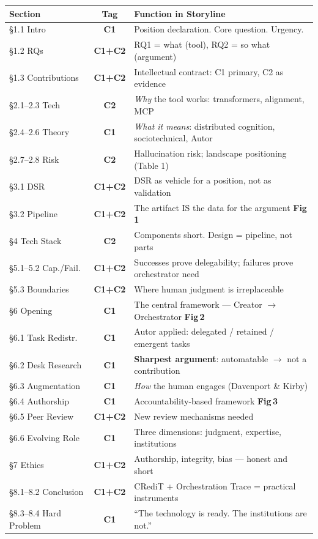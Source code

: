 \documentclass[11pt,a4paper]{article}
\newcommand{\ctag}[2]{\colorbox{#1}{\small\color{white}\textbf{#2}}}
\newcommand{\Cone}{\ctag{c1color}{C1}}
\newcommand{\Ctwo}{\ctag{c2color}{C2}}
\newcommand{\Cboth}{\ctag{bothcolor}{C1+C2}}
\newcommand{\figref}[1]{{\scriptsize\color{figcolor}\textbf{Fig\,#1}}}
\begin{document}
\renewcommand{\arraystretch}{1.12}
{\small
\begin{tabularx}{\textwidth}{@{} l c X @{}}
\toprule
\textbf{Section} & \textbf{Tag} & \textbf{Function in Storyline} \\
\midrule
\S1.1 Intro & \Cone & Position declaration. Core question. Urgency. \\
\S1.2 RQs & \Cboth & RQ1 = what (tool), RQ2 = so what (argument) \\
\S1.3 Contributions & \Cboth & Intellectual contract: C1 primary, C2 as evidence \\
\midrule
\S2.1--2.3 Tech & \Ctwo & \textit{Why} the tool works: transformers, alignment, MCP \\
\S2.4--2.6 Theory & \Cone & \textit{What it means}: distributed cognition, sociotechnical, Autor \\
\S2.7--2.8 Risk & \Ctwo & Hallucination risk; landscape positioning (Table 1) \\
\midrule
\S3.1 DSR & \Cboth & DSR as vehicle for a position, not as validation \\
\S3.2 Pipeline & \Cboth & The artifact IS the data for the argument \hfill \figref{1} \\
\midrule
\S4 Tech Stack & \Ctwo & Components short. Design = pipeline, not parts \\
\S5.1--5.2 Cap./Fail. & \Cboth & Successes prove delegability; failures prove orchestrator need \\
\S5.3 Boundaries & \Cboth & Where human judgment is irreplaceable \\
\midrule
\S6 Opening & \Cone & The central framework --- Creator $\to$ Orchestrator \hfill \figref{2} \\
\S6.1 Task Redistr. & \Cone & Autor applied: delegated / retained / emergent tasks \\
\S6.2 Desk Research & \Cone & \textbf{Sharpest argument}: automatable $\rightarrow$ not a contribution \\
\S6.3 Augmentation & \Cone & \textit{How} the human engages (Davenport \& Kirby) \\
\S6.4 Authorship & \Cone & Accountability-based framework \hfill \figref{3} \\
\S6.5 Peer Review & \Cboth & New review mechanisms needed \\
\S6.6 Evolving Role & \Cone & Three dimensions: judgment, expertise, institutions \\
\midrule
\S7 Ethics & \Cboth & Authorship, integrity, bias --- honest and short \\
\S8.1--8.2 Conclusion & \Cboth & CRediT + Orchestration Trace = practical instruments \\
\S8.3--8.4 Hard Problem & \Cone & ``The technology is ready. The institutions are not.'' \\
\bottomrule
\end{tabularx}
}
\end{document}
